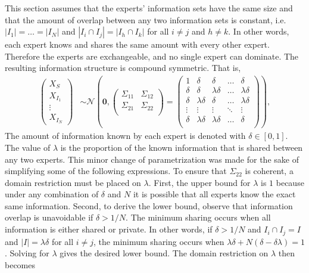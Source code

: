\documentclass[11pt]{article}
\theoremstyle{definition}
\theoremstyle{definition}
\begin{document}
This section assumes that the experts' information sets have the same size and that the amount of overlap between any two information sets is constant, i.e.  $|I_{1}| =  \dots = |I_{N}|$ and $|I_{i} \cap I_{j}| = |I_{h} \cap I_{k}|$ for all $i \neq j$ and $h \neq k$. In other words, each expert knows and shares the same amount with every other expert. Therefore the experts are exchangeable, and no single expert can dominate. The resulting information structure is compound symmetric. That is,
\begin{align*}
\left(\begin{matrix} X_{S} \\ X_{I_1}\\ \vdots \\ X_{I_N} \end{matrix}\right) &\sim \mathcal{N}\left( 
 \boldsymbol{0}, \left(\begin{matrix} 
\Sigma_{11} & \Sigma_{12}\\
\Sigma_{21} & \Sigma_{22}\\
 \end{matrix}\right) 
 =
 \left(\begin{array}{c|cccc}
1 & \delta & \delta & \dots & \delta  \\ \hline
\delta & \delta &\lambda\delta & \dots & \lambda\delta   \\ 
\delta & \lambda\delta & \delta & \dots & \lambda\delta  \\ 
\vdots & \vdots & \vdots & \ddots & \vdots  \\ 
\delta & \lambda\delta & \lambda\delta & \dots & \delta\\ 
 \end{array}\right)\right),
\end{align*}
The amount of information known by each expert is denoted with $\delta \in [0,1]$. The value of $\lambda$ is the proportion of the known information that is shared between any two experts.  This minor change of parametrization was made for the sake of simplifying some of the following expressions. To ensure that $\Sigma_{22}$ is coherent, a domain restriction must be placed on $\lambda$. First, the upper bound for $\lambda$ is $1$ because under any combination of $\delta$ and $N$ it is possible that all experts know the exact same information. Second, to derive the lower bound, observe that information overlap is unavoidable if $\delta > 1/N$. The minimum sharing occurs when all information is either shared or private. In other words, if $\delta > 1/N$ and $I_{i} \cap I_j = I$ and $|I| =  \lambda \delta$ for all $i \neq j$, the minimum sharing occurs when $\lambda\delta + N(\delta - \delta\lambda) = 1$. Solving for $\lambda$ gives the desired lower bound. The domain restriction on $\lambda$ then becomes
\end{document}
